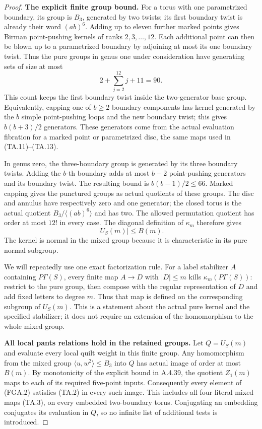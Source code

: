 \begin{proof}
\par\medskip\noindent\textbf{The explicit finite group bound.}\quad
For a torus with one parametrized boundary, its group is
$B_3$, generated by two twists; its first boundary twist
is already their word $(ab)^6$.  Adding up to eleven
further marked points gives Birman point-pushing kernels
of ranks $2,3,\ldots,12$.  Each additional point can then
be blown up to a parametrized boundary by adjoining at
most its one boundary twist.  Thus the pure groups in
genus one under consideration have generating sets of
size at most
\[
               2+\sum_{j=2}^{12}j+11=90.
                                                               \tag{FGA.5}
\]
This count keeps the first boundary twist inside the
two-generator base group.  Equivalently, capping one
of $b\geq2$ boundary components has kernel generated
by the $b$ simple point-pushing loops and the new
boundary twist; this gives $b(b+3)/2$ generators.
These generators come from the actual evaluation
fibration for a marked point or parametrized disc,
the same maps used in (TA.11)--(TA.13).

In genus zero, the three-boundary group is generated
by its three boundary twists.  Adding the $b$-th
boundary adds at most $b-2$ point-pushing generators
and its boundary twist.  The resulting bound is
$b(b-1)/2\leq66$.  Marked capping gives the punctured
groups as actual quotients of these groups.  The
disc and annulus have respectively zero and one
generator; the closed torus is the actual quotient
$B_3/\langle(ab)^6\rangle$ and has two.
The allowed permutation quotient has order at most
$12!$ in every case.  The diagonal definition of
$\kappa_m$ therefore gives
\[
                  |U_S(m)|\leq B(m).
                                                               \tag{FGA.6}
\]
The kernel is normal in the mixed group because it
is characteristic in its pure normal subgroup.

We will repeatedly use one exact factorization rule.
For a label stabilizer $A$ containing $P\Gamma(S)$,
every finite map $A\to D$ with $|D|\leq m$ kills
$\kappa_m(P\Gamma(S))$: restrict to the pure group,
then compose with the regular representation of $D$
and add fixed letters to degree $m$.
Thus that map is defined on the corresponding
subgroup of $U_S(m)$.  This is a statement about the
actual pure kernel and the specified stabilizer;
it does not require an extension of the homomorphism
to the whole mixed group.

\par\medskip\noindent\textbf{All local pants relations hold in the retained groups.}\quad
Let $Q=U_S(m)$ and evaluate every local quilt weight
in this finite group.  Any homomorphism from the
mixed group $\langle u,w^2\rangle\leq B_3$ into $Q$
has actual image of order at most $B(m)$.
By monotonicity of the explicit bound in A.4.39,
the quotient $Z_1(m)$ maps to each of its required
five-point inputs.  Consequently every element of
(FGA.2) satisfies (TA.2) in every such image.
This includes all four literal mixed maps (TA.3),
on every embedded two-boundary torus.  Conjugating
an embedding conjugates its evaluation in $Q$, so
no infinite list of additional tests is introduced.


\end{proof}
